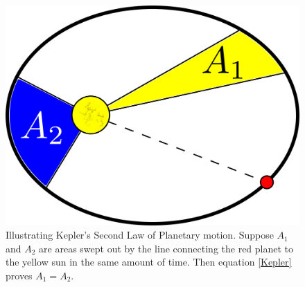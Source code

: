 \documentclass[]{article}
\newcommand{\eqn}[1]{equation \eqref{#1}}
\newcommand{\ttp}{.45\textwidth}
\begin{document}
\begin{figure}[h!!!tb]
\centering
\includegraphics[width=\ttp]{../../Pictures/Kepler.png}
\caption{\label{Kepler_law} Illustrating Kepler's Second Law of Planetary motion. Suppose $A_1$ and $A_2$ are areas swept out by the line connecting the red planet to the yellow sun in the same amount of time. Then \eqn{Kepler} proves $A_1=A_2$.}
\end{figure}
\end{document}
